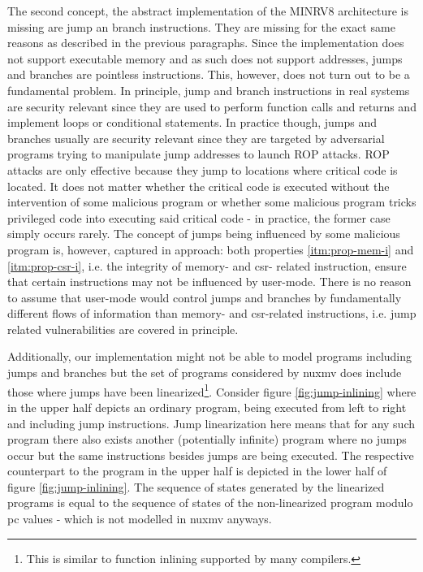 The second concept, the abstract implementation of the MINRV8 architecture is missing are jump an branch instructions.
They are missing for the exact same reasons as described in the previous paragraphs.
Since the implementation does not support executable memory and as such does not support addresses, jumps and branches are pointless instructions.
This, however, does not turn out to be a fundamental problem.
In principle, jump and branch instructions in real systems are security relevant since they are used to perform function calls and returns and implement loops or conditional statements.
In practice though, jumps and branches usually are security relevant since they are targeted by adversarial programs trying to manipulate jump addresses to launch ROP attacks.
ROP attacks are only effective because they jump to locations where critical code is located.
It does not matter whether the critical code is executed without the intervention of some malicious program or whether some malicious program tricks privileged code into executing said critical code - in practice, the former case simply occurs rarely.
The concept of jumps being influenced by some malicious program is, however, captured in approach: both properties \ref{itm:prop-mem-i} and \ref{itm:prop-csr-i}, i.e. the integrity of memory- and \gls{csr}- related instruction, ensure that certain instructions may not be influenced by user-mode.
There is no reason to assume that user-mode would control jumps and branches by fundamentally different flows of information than memory- and \gls{csr}-related instructions, i.e. jump related vulnerabilities are covered in principle.

Additionally, our implementation might not be able to model programs including jumps and branches but the set of programs considered by \gls{nuxmv} does include those where jumps have been linearized\footnote{%
    This is similar to function inlining supported by many compilers.
}.
Consider figure \ref{fig:jump-inlining} where in the upper half depicts an ordinary program, being executed from left to right and including jump instructions.
Jump linearization here means that for any such program there also exists another (potentially infinite) program where no jumps occur but the same instructions besides jumps are being executed.
The respective counterpart to the program in the upper half is depicted in the lower half of figure \ref{fig:jump-inlining}.
The sequence of states generated by the linearized programs is equal to the sequence of states of the non-linearized program modulo \gls{pc} values - which is not modelled in \gls{nuxmv} anyways.


